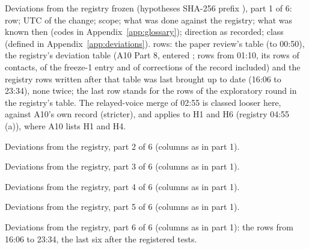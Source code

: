 \begin{table}[tp]
\centering
\small

\caption{Deviations from the registry frozen \RegistryFrozenStamp{} (hypotheses SHA-256 prefix \HypothesesShaPrefix),
part 1 of 6: row; UTC of the change; scope; what was done against the registry; what was known then (codes in
Appendix~\ref{app:glossary}); direction as recorded; class (defined in Appendix~\ref{app:deviations}).
\NDeviationRows{} rows: the paper review's table (to 00:50), the registry's deviation table (A10 Part 8, entered
\ATenStamp; rows from 01:10, its rows of contacts, of the freeze-1 entry and of corrections of the record included) and
the registry rows written after that table was last brought up to date (16:06 to 23:34), none twice; the last row
stands for the \NDevRoundRows{} rows of the exploratory round in the registry's table. The relayed-voice
merge of 02:55 is classed looser here, against A10's own record (stricter), and applies to H1 and H6 (registry 04:55
(a)), where A10 lists H1 and H4.}
\label{tab:deviations}
\end{table}

\begin{table}[tp]
\centering
\small

\caption{Deviations from the registry, part 2 of 6 (columns as in part 1).}
\label{tab:deviations-b}
\end{table}

\begin{table}[tp]
\centering
\small

\caption{Deviations from the registry, part 3 of 6 (columns as in part 1).}
\label{tab:deviations-c}
\end{table}

\begin{table}[tp]
\centering
\small

\caption{Deviations from the registry, part 4 of 6 (columns as in part 1).}
\label{tab:deviations-d}
\end{table}

\begin{table}[tp]
\centering
\small

\caption{Deviations from the registry, part 5 of 6 (columns as in part 1).}
\label{tab:deviations-e}
\end{table}

\begin{table}[tp]
\centering
\small

\caption{Deviations from the registry, part 6 of 6 (columns as in part 1): the rows from 16:06 to 23:34, the last six
after the registered tests.}
\label{tab:deviations-f}
\end{table}

